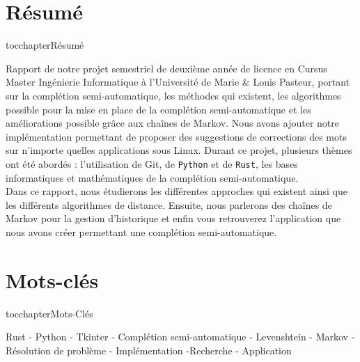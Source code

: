 \documentclass[a4paper, 11pt]{report}
\newcommand{\langage}[1]{\texttt{#1}}
\begin{document}
{\begin{center}
    \section*{Résumé}
    \addcontentsline
    {toc}{chapter}{Résumé}
    \begin{justify}
    Rapport de notre projet semestriel de deuxième année de licence en Cursus Master Ingénierie Informatique à l’Université de Marie \& Louis Pasteur, portant sur la complétion semi-automatique, les méthodes qui existent, les algorithmes possible pour la mise en place de la complétion semi-automatique et les améliorations possible grâce aux chaînes de Markov. Nous avons ajouter notre implémentation permettant de proposer des suggestions de corrections des mots sur n'importe quelles applications sous Linux. Durant ce projet, plusieurs thèmes ont été abordés : l'utilisation de Git, de \langage{Python} et de \langage{Rust}, les bases informatiques et mathématiques de la complétion semi-automatique.\\
Dans ce rapport, nous étudierons les différentes approches qui existent ainsi que  les différents algorithmes de distance. Ensuite, nous parlerons  des chaînes de Markov pour la gestion d'historique et enfin vous retrouverez l'application que nous avons créer permettant une complétion semi-automatique.

    \end{justify}
    \vspace*{\fill} %

    \section*{Mots-clés}
    \addcontentsline
    {toc}{chapter}{Mots-Clés}
    \begin{justify}
     Rust - Python - Tkinter - Complétion semi-automatique - Levenshtein - Markov - Résolution de problème - Implémentation -Recherche - Application
    \end{justify}
    \vspace*{\fill} %


\end{center}}
\end{document}
